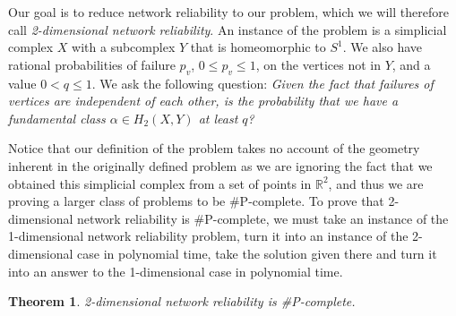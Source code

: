\documentclass[10pt,twocolumn]{article} \usepackage{amsmath,epsf,amssymb,cite,pifont,amsthm, mathrsfs,epsfig,  bbm, amsthm,  setspace}
\newtheorem{thm}{Theorem}
\newcommand{\R}{\mathbb R}
\renewcommand{\1}{\mathbbm{1}}
\begin{document}
Our goal is to reduce network reliability to our problem, which we will therefore call
{\em 2-dimensional network reliability}.
An instance of the problem is a simplicial complex $X$ with a subcomplex
$Y$ that is homeomorphic to $S^1$.
We also have rational probabilities of failure $p_v$, $0 \leq p_v \leq 1$, on the  vertices not in $Y$,
and a value $0<q\leq 1$.
We ask the following question:
{\em Given the fact that failures of vertices are independent of each other, is the probability
that we have a fundamental class $\alpha \in H_2(X,Y)$ at least $q$?}

Notice that our definition of the problem takes no account of the geometry inherent in the
originally defined problem
as we are ignoring the fact that we obtained this simplicial complex from a set of points in $\R^2$, and thus we are proving a larger class of problems to be \#P-complete.
To prove that 2-dimensional network reliability is \#P-complete, we must take an instance of the
1-dimensional network reliability problem, turn it into an instance of the 2-dimensional case in
polynomial time, take the solution given there and turn it into an answer to the 1-dimensional
case in polynomial time.


\begin{thm}
2-dimensional network reliability is \#P-complete.
\end{thm}
\end{document}
